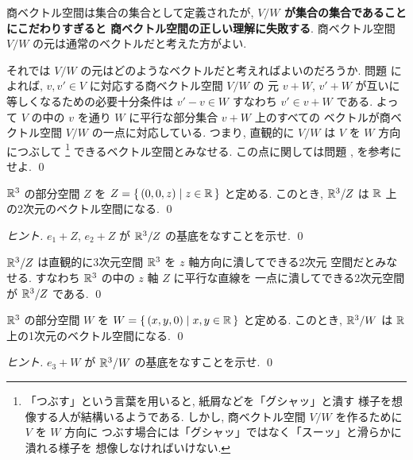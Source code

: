 \documentclass[12pt,twoside]{jarticle}
\begin{document}
\begin{rem}
  商ベクトル空間は集合の集合として定義されたが,
  {\bf $V/W$ が集合の集合であることにこだわりすぎると
  商ベクトル空間の正しい理解に失敗する}.
  商ベクトル空間 $V/W$ の元は通常のベクトルだと考えた方がよい.

  それでは $V/W$ の元はどのようなベクトルだと考えればよいのだろうか.
  問題  によれば, $v,v'\in V$ に対応する商ベクトル空間 $V/W$ の
  元 $v+W$, $v'+W$ が互いに等しくなるための必要十分条件は $v'-v\in W$ 
  すなわち $v'\in v+W$ である.
  よって $V$ の中の $v$ を通り $W$ に平行な部分集合 $v+W$ 上のすべての
  ベクトルが商ベクトル空間 $V/W$ の一点に対応している.
  つまり, 直観的に $V/W$ は $V$ を $W$ 方向につぶして%
  \footnote{「つぶす」という言葉を用いると, 紙屑などを「グシャッ」と潰す
    様子を想像する人が結構いるようである.  
    しかし, 商ベクトル空間 $V/W$ を作るために $V$ を $W$ 方向に
    つぶす場合には「グシャッ」ではなく「スーッ」と滑らかに潰れる様子を
    想像しなければいけない.}%
  できるベクトル空間とみなせる.  
  この点に関しては問題 ,  を参考にせよ.
  \qed
\end{rem}


\begin{question}
  \label{q:R^3/Z}
  ${\mathbb R}^3$ の部分空間 $Z$ を $Z=\{\,(0,0,z)\mid z\in{\mathbb R}\,\}$ と定める.
  このとき, ${\mathbb R}^3/Z$ は ${\mathbb R}$ 上の2次元のベクトル空間になる.
  \qed
\end{question}

\begin{proof}[ヒント]
  $e_1+Z$, $e_2+Z$ が ${\mathbb R}^3/Z$ の基底をなすことを示せ. \qed
\end{proof}

\begin{rem}
  ${\mathbb R}^3/Z$ は直観的に3次元空間 ${\mathbb R}^3$ を $z$ 軸方向に潰してできる2次元
  空間だとみなせる. すなわち ${\mathbb R}^3$ の中の $z$ 軸 $Z$ に平行な直線を
  一点に潰してできる2次元空間が ${\mathbb R}^3/Z$ である.
  \qed
\end{rem}


\begin{question}
  \label{q:R^3/W}
  ${\mathbb R}^3$ の部分空間 $W$ を $W=\{\,(x,y,0)\mid x,y\in{\mathbb R}\,\}$ と定める.
  このとき, ${\mathbb R}^3/W$ は ${\mathbb R}$ 上の1次元のベクトル空間になる.
  \qed
\end{question}

\begin{proof}[ヒント]
  $e_3+W$ が ${\mathbb R}^3/W$ の基底をなすことを示せ. \qed
\end{proof}
\end{document}
